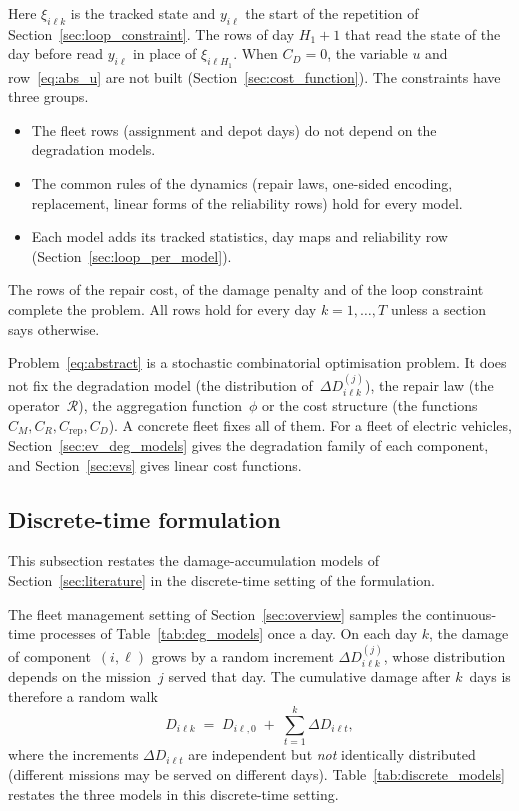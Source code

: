 \documentclass[11pt,a4paper]{article}
\theoremstyle{plain}
\theoremstyle{definition}
\theoremstyle{remark}
\begin{document}
Here $\xi_{i\ell k}$ is the tracked state and $y_{i\ell}$ the start of the repetition of Section~\ref{sec:loop_constraint}.
The rows of day $H_1 + 1$ that read the state of the day before read $y_{i\ell}$ in place of $\xi_{i\ell H_1}$.
When $C_D = 0$, the variable $u$ and row~\eqref{eq:abs_u} are not built (Section~\ref{sec:cost_function}).
The constraints have three groups.
\begin{itemize}
  \item The fleet rows (assignment and depot days) do not depend on the degradation models.
  \item The common rules of the dynamics (repair laws, one-sided encoding, replacement, linear forms of the reliability rows) hold for every model.
  \item Each model adds its tracked statistics, day maps and reliability row (Section~\ref{sec:loop_per_model}).
\end{itemize}
The rows of the repair cost, of the damage penalty and of the loop constraint complete the problem.
All rows hold for every day $k = 1, \ldots, T$ unless a section says otherwise.

Problem~\eqref{eq:abstract} is a stochastic combinatorial optimisation problem.
It does not fix the degradation model (the distribution of~$\Delta D_{i\ell k}^{(j)}$), the repair law (the operator~$\mathcal{R}$), the aggregation function~$\phi$ or the cost structure (the functions $C_M, C_R, C_{\mathrm{rep}}, C_D$).
A concrete fleet fixes all of them. For a fleet of electric vehicles, Section~\ref{sec:ev_deg_models} gives the degradation family of each component, and Section~\ref{sec:evs} gives linear cost functions.

\subsection{Discrete-time formulation}
\label{sec:discrete_deg}

This subsection restates the damage-accumulation models of Section~\ref{sec:literature} in the discrete-time setting of the formulation.

The fleet management setting of Section~\ref{sec:overview} samples the continuous-time processes of Table~\ref{tab:deg_models} once a day.
On each day $k$, the damage of component~$(i,\ell)$ grows by a random increment $\Delta D_{i\ell k}^{(j)}$, whose distribution depends on the mission~$j$ served that day.
The cumulative damage after $k$~days is therefore a random walk
\begin{equation}\label{eq:discrete_damage}
  D_{i\ell k} \;=\; D_{i\ell,0} \;+\; \sum_{t=1}^{k} \Delta D_{i\ell t},
\end{equation}
where the increments $\Delta D_{i\ell t}$ are independent but \emph{not} identically distributed (different missions may be served on different days).
Table~\ref{tab:discrete_models} restates the three models in this discrete-time setting.
\end{document}
